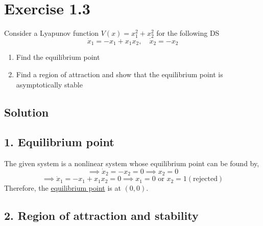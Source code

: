 \section*{Exercise 1.3}

Consider a Lyapunov function \( V(x)=x_{1}^{2}+x_{2}^{2} \) for the following DS
\begin{equation*}
    \dot{x}_{1}=-x_{1}+x_{1} x_{2}, \quad \dot{x}_{2}=-x_{2}
\end{equation*}
\begin{enumerate}[noitemsep]
    \item Find the equilibrium point
    \item Find a region of attraction and show that the equilibrium point is asymptotically stable
\end{enumerate}

\subsection*{Solution}

\subsection*{1. Equilibrium point}

The given system is a nonlinear system whose equilibrium point can be found by,
\[
    \implies
    \dot{x}_{2} = -x_{2} = 0
    \implies
    x_{2} = 0
\]
\[
    \implies
    \dot{x}_{1} = -x_{1} + x_{1} x_{2} = 0
    \implies
    x_{1} = 0 \text{ or } x_{2} = 1 (\text{rejected})
\]
Therefore, the \underline{equilibrium point} is at \( \boxed{ (0, 0) } \).

\subsection*{2. Region of attraction and stability}
